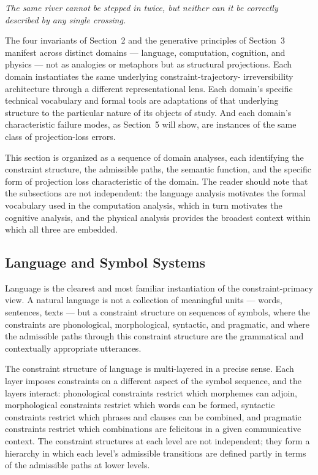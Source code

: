 \documentclass[12pt, twoside]{article}
\theoremstyle{plain}
\theoremstyle{definition}
\theoremstyle{remark}
\begin{document}
\epigraph{\itshape
  The same river cannot be stepped in twice, but neither can it
  be correctly described by any single crossing.}{}

The four invariants of Section~2 and the generative principles
of Section~3 manifest across distinct domains — language, computation,
cognition, and physics — not as analogies or metaphors but as
structural projections.
Each domain instantiates the same underlying constraint-trajectory-
irreversibility architecture through a different representational lens.
Each domain's specific technical vocabulary and formal tools are
adaptations of that underlying structure to the particular nature of
its objects of study.
And each domain's characteristic failure modes, as Section~5 will show,
are instances of the same class of projection-loss errors.

This section is organized as a sequence of domain analyses,
each identifying the constraint structure, the admissible paths,
the semantic function, and the specific form of projection loss
characteristic of the domain.
The reader should note that the subsections are not independent:
the language analysis motivates the formal vocabulary used in the
computation analysis, which in turn motivates the cognitive analysis,
and the physical analysis provides the broadest context within
which all three are embedded.

\subsection{Language and Symbol Systems}

Language is the clearest and most familiar instantiation of the
constraint-primacy view.
A natural language is not a collection of meaningful units —
words, sentences, texts — but a constraint structure on sequences of
symbols, where the constraints are phonological, morphological,
syntactic, and pragmatic, and where the admissible paths through
this constraint structure are the grammatical and contextually
appropriate utterances.

The constraint structure of language is multi-layered in a precise sense.
Each layer imposes constraints on a different aspect of the symbol
sequence, and the layers interact: phonological constraints restrict
which morphemes can adjoin, morphological constraints restrict which
words can be formed, syntactic constraints restrict which phrases and
clauses can be combined, and pragmatic constraints restrict which
combinations are felicitous in a given communicative context.
The constraint structures at each level are not independent;
they form a hierarchy in which each level's admissible transitions
are defined partly in terms of the admissible paths at lower levels.
\end{document}
